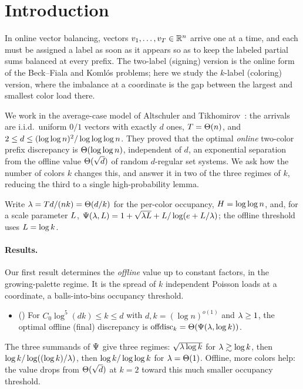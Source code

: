 \section{Introduction}\label{sec:intro}

In online vector balancing, vectors $v_1,\dots,v_T\in\mathbb{R}^n$ arrive one at a time, and each must be assigned a label as soon
as it appears so as to keep the labeled partial sums balanced at every prefix. The two-label (signing) version is the online
form of the Beck--Fiala and Koml\'os problems; here we study the $k$-label (coloring) version, where the imbalance at a
coordinate is the gap between the largest and smallest color load there.

We work in the average-case model of Altschuler and Tikhomirov~\cite{AT2025}: the arrivals are i.i.d.\ uniform $0/1$ vectors
with exactly $d$ ones, $T=\Theta(n)$, and $2\le d\le(\log\log n)^2/\log\log\log n$. They proved that the optimal \emph{online}
two-color prefix discrepancy is $\Theta(\log\log n)$, independent of $d$, an exponential separation from the offline value
$\Theta(\sqrt d)$ of random $d$-regular set systems. We ask how the number of colors $k$ changes this, and answer it in two of
the three regimes of $k$, reducing the third to a single high-probability lemma.

Write $\lambda=Td/(nk)=\Theta(d/k)$ for the per-color occupancy, $H=\log\log n$, and, for a scale parameter $L$,
$\Psi(\lambda,L)=1+\sqrt{\lambda L}+L/\log(e+L/\lambda)$; the offline threshold uses $L=\log k$.

\paragraph{Results.}
Our first result determines the \emph{offline} value up to constant factors, in the growing-palette regime. It is the spread
of $k$ independent Poisson loads at a coordinate, a balls-into-bins occupancy threshold.

\begin{itemize}
  \item[\textbf{(T1)}] () For $C_0\log^5(dk)\le k\le d$ with $d,k=(\log n)^{o(1)}$ and $\lambda\ge1$, the
  optimal offline (final) discrepancy is $\mathrm{offdisc}_k=\Theta(\Psi(\lambda,\log k))$.
\end{itemize}
The three summands of $\Psi$ give three regimes: $\sqrt{\lambda\log k}$ for $\lambda\gtrsim\log k$, then
$\log k/\log((\log k)/\lambda)$, then $\log k/\log\log k$ for $\lambda=\Theta(1)$. Offline, more colors help: the value drops from
$\Theta(\sqrt d)$ at $k=2$ toward this much smaller occupancy threshold.

